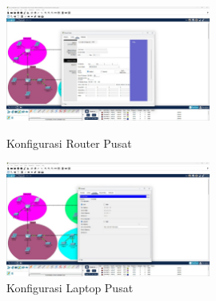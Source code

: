 \begin{figure}[h!]
    \centering
    \begin{minipage}{0.48\textwidth}
        \centering
        \includegraphics[width=0.6\textwidth]{img/Pusat_R.jpeg}
        \caption*{Konfigurasi Router Pusat}
        \label{fig:cfg_router_pusat}
    \end{minipage}\hfill
    \begin{minipage}{0.48\textwidth}
        \centering
        \includegraphics[width=0.6\textwidth]{img/Pusat_L.jpeg}
        \caption*{Konfigurasi Laptop Pusat}
        \label{fig:cfg_laptop_pusat}
    \end{minipage}
\end{figure}

